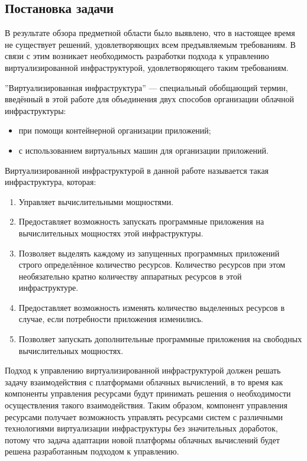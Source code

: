 \subsection{Постановка задачи}
\label{formulation}
В результате обзора предметной области было выявлено, что в настоящее время не существует решений, удовлетворяющих всем предъявляемым требованиям.
В связи с этим возникает необходимость разработки подхода к управлению виртуализированной инфраструктурой, удовлетворяющего таким требованиям.

''Виртуализированная инфраструктура'' --- специальный обобщающий термин, введённый в этой работе для объединения двух способов организации облачной инфраструктуры:
\begin{itemize}
    \item при помощи контейнерной организации приложений;
    \item с использованием виртуальных машин для организации приложений.
\end{itemize}
Виртуализированной инфраструктурой в данной работе называется такая инфраструктура, которая:
\begin{enumerate}
    \item Управляет вычислительными мощностями.
    \item Предоставляет возможность запускать программные приложения на вычислительных мощностях этой инфраструктуры.
    \item Позволяет выделять каждому из запущенных программных приложений строго определённое количество ресурсов. 
    Количество ресурсов при этом необязательно кратно количеству аппаратных ресурсов в этой инфраструктуре.
    \item Предоставляет возможность изменять количество выделенных ресурсов в случае, если потребности приложения изменились.
    \item Позволяет запускать дополнительные программные приложения на свободных вычислительных мощностях.
\end{enumerate}

Подход к управлению виртуализированной инфраструктурой должен решать задачу взаимодействия с платформами облачных вычислений, в то время как компоненты управления ресурсами будут принимать решения о необходимости осуществления такого взаимодействия.
Таким образом, компонент управления ресурсами получает возможность управлять ресурсами систем с различными технологиями виртуализации инфраструктуры без значительных доработок, потому что задача адаптации новой платформы облачных вычислений будет решена разработанным подходом к управлению.

